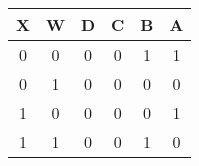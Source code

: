 \begin{tabular}{|c|c||c|c|c|c|}
\hline
X & W & D & C & B & A\\
\hline
0 & 0 & 0 & 0 & 1 & 1\\
0 & 1 & 0 & 0 & 0 & 0\\
1 & 0 & 0 & 0 & 0 & 1\\
1 & 1 & 0 & 0 & 1 & 0\\
\hline
\end{tabular}
